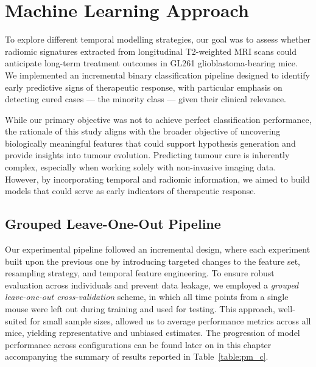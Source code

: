 \documentclass[12pt, a4paper]{report}
\begin{document}
\vspace{1em}




\section{Machine Learning Approach}

To explore different temporal modelling strategies, our goal was to assess whether radiomic signatures extracted from longitudinal T2-weighted MRI scans could anticipate long-term treatment outcomes in GL261 glioblastoma-bearing mice. We implemented an incremental binary classification pipeline designed to identify early predictive signs of therapeutic response, with particular emphasis on detecting cured cases — the minority class — given their clinical relevance.

While our primary objective was not to achieve perfect classification performance, the rationale of this study aligns with the broader objective of uncovering biologically meaningful features that could support hypothesis generation and provide insights into tumour evolution. Predicting tumour cure is inherently complex, especially when working solely with non-invasive imaging data. However, by incorporating temporal and radiomic information, we aimed to build models that could serve as early indicators of therapeutic response.

\subsection{Grouped Leave-One-Out Pipeline}

Our experimental pipeline followed an incremental design, where each experiment built upon the previous one by introducing targeted changes to the feature set, resampling strategy, and temporal feature engineering. To ensure robust evaluation across individuals and prevent data leakage, we employed a \textit{grouped leave-one-out cross-validation} scheme, in which all time points from a single mouse were left out during training and used for testing. This approach, well-suited for small sample sizes, allowed us to average performance metrics across all mice, yielding representative and unbiased estimates. The progression of model performance across configurations can be found later on in this chapter accompanying the summary of results reported in Table~\ref{table:pm_c}.
\end{document}
